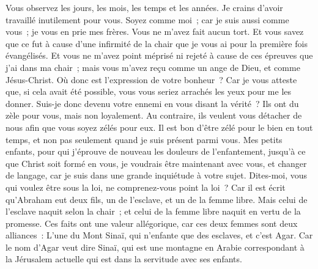 \begin{multicols}{2}
Vous observez les jours, les mois, les temps et les années.
Je crains d'avoir travaillé inutilement pour vous.
Soyez comme moi~; car je suis aussi comme vous~; je vous en prie mes frères.
Vous ne m'avez fait aucun tort. Et vous savez que ce fut à cause d'une infirmité de la chair que je vous ai pour la première fois évangélisés.
Et vous ne m'avez point méprisé ni rejeté à cause de ces épreuves que j'ai dans ma chair~; mais vous m'avez reçu comme un ange de Dieu, et comme Jésus-Christ.
Où donc est l'expression de votre bonheur~? Car je vous atteste que, si cela avait été possible, vous vous seriez arrachés les yeux pour me les donner.
Suis-je donc devenu votre ennemi en vous disant la vérité~?
Ils ont du zèle pour vous, mais non loyalement. Au contraire, ils veulent vous détacher de nous afin que vous soyez zélés pour eux.
Il est bon d'être zélé pour le bien en tout temps, et non pas seulement quand je suis présent parmi vous.
Mes petits enfants, pour qui j'éprouve de nouveau les douleurs de l'enfantement, jusqu'à ce que Christ soit formé en vous,
je voudrais être maintenant avec vous, et changer de langage, car je suis dans une grande inquiétude à votre sujet.
Dites-moi, vous qui voulez être sous la loi, ne comprenez-vous point la loi~?
Car il est écrit qu'Abraham eut deux fils, un de l'esclave, et un de la femme libre.
Mais celui de l'esclave naquit selon la chair~; et celui de la femme libre naquit en vertu de la promesse.
Ces faits ont une valeur allégorique, car ces deux femmes sont deux alliances~: L'une du Mont Sinaï, qui n'enfante que des esclaves, et c'est Agar.
Car le nom d'Agar veut dire Sinaï, qui est une montagne en Arabie correspondant à la Jérusalem actuelle qui est dans la servitude avec ses enfants.

\end{multicols}
